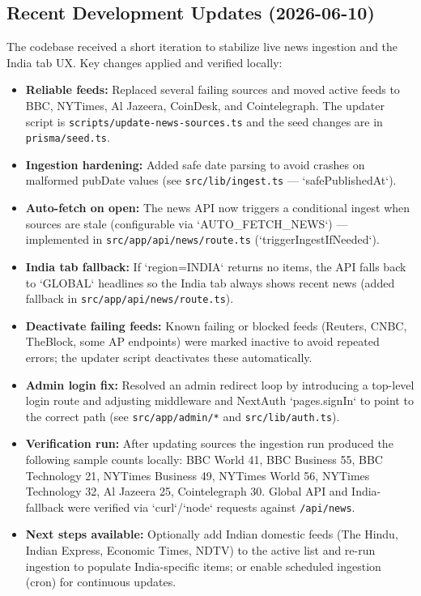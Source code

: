 \documentclass[12pt,a4paper]{article}
\begin{document}
\subsection{Recent Development Updates (2026-06-10)}

The codebase received a short iteration to stabilize live news ingestion and the India tab UX. Key changes applied and verified locally:

\begin{itemize}[nosep]
  \item \textbf{Reliable feeds:} Replaced several failing sources and moved active feeds to BBC, NYTimes, Al Jazeera, CoinDesk, and Cointelegraph. The updater script is \texttt{scripts/update-news-sources.ts} and the seed changes are in \texttt{prisma/seed.ts}.
  \item \textbf{Ingestion hardening:} Added safe date parsing to avoid crashes on malformed pubDate values (see \texttt{src/lib/ingest.ts} — `safePublishedAt`).
  \item \textbf{Auto-fetch on open:} The news API now triggers a conditional ingest when sources are stale (configurable via `AUTO_FETCH_NEWS`) — implemented in \texttt{src/app/api/news/route.ts} (`triggerIngestIfNeeded`).
  \item \textbf{India tab fallback:} If `region=INDIA` returns no items, the API falls back to `GLOBAL` headlines so the India tab always shows recent news (added fallback in \texttt{src/app/api/news/route.ts}).
  \item \textbf{Deactivate failing feeds:} Known failing or blocked feeds (Reuters, CNBC, TheBlock, some AP endpoints) were marked inactive to avoid repeated errors; the updater script deactivates these automatically.
  \item \textbf{Admin login fix:} Resolved an admin redirect loop by introducing a top-level login route and adjusting middleware and NextAuth `pages.signIn` to point to the correct path (see \texttt{src/app/admin/*} and \texttt{src/lib/auth.ts}).
  \item \textbf{Verification run:} After updating sources the ingestion run produced the following sample counts locally: BBC World 41, BBC Business 55, BBC Technology 21, NYTimes Business 49, NYTimes World 56, NYTimes Technology 32, Al Jazeera 25, Cointelegraph 30. Global API and India-fallback were verified via `curl`/`node` requests against \texttt{/api/news}.
  \item \textbf{Next steps available:} Optionally add Indian domestic feeds (The Hindu, Indian Express, Economic Times, NDTV) to the active list and re-run ingestion to populate India-specific items; or enable scheduled ingestion (cron) for continuous updates.
\end{itemize}
\end{document}
